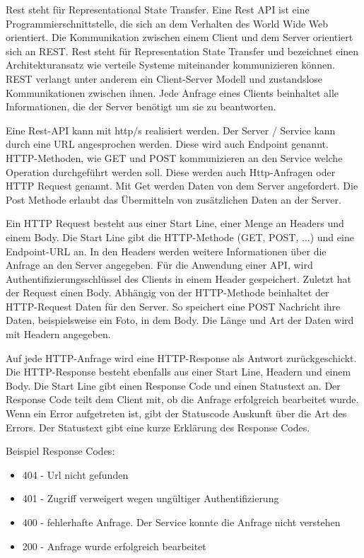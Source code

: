 Rest steht für Representational State Transfer. Eine Rest API ist eine Programmierschnittstelle, die sich an dem Verhalten des World Wide Web orientiert. Die Kommunikation zwischen einem Client und dem Server orientiert sich an REST.
Rest steht für Representation State Transfer und bezeichnet einen Architekturansatz wie verteile Systeme miteinander kommunizieren können. REST verlangt unter anderem ein Client-Server Modell und zustandslose Kommunikationen zwischen ihnen. Jede Anfrage eines Clients beinhaltet alle Informationen, die der Server benötigt um sie zu beantworten. %

Eine Rest-API kann mit http/s realisiert werden. Der Server / Service kann durch eine URL angesprochen werden. Diese wird auch Endpoint genannt. HTTP-Methoden, wie GET und POST kommunizieren an den Service welche Operation durchgeführt werden soll. Diese werden auch Http-Anfragen oder HTTP Request genannt. Mit Get werden Daten von dem Server angefordert. Die Post Methode erlaubt das Übermitteln von zusätzlichen Daten an der Server.

Ein HTTP Request besteht aus einer Start Line, einer Menge an Headers und einem Body. Die Start Line gibt die HTTP-Methode (GET, POST, ...) und eine Endpoint-URL an.
In den Headers werden weitere Informationen über die Anfrage an den Server angegeben. Für die Anwendung einer API, wird Authentifizierungsschlüssel des Clients in einem Header gespeichert.
Zuletzt hat der Request einen Body. Abhängig von der HTTP-Methode beinhaltet der HTTP-Request Daten für den Server. So speichert eine POST Nachricht ihre Daten, beispielsweise ein Foto, in dem Body. Die Länge und Art der Daten wird mit Headern angegeben.
  
Auf jede HTTP-Anfrage wird eine HTTP-Response als Antwort zurückgeschickt. 
Die HTTP-Response besteht ebenfalls aus einer Start Line, Headern und einem Body. Die Start Line gibt einen Response Code und einen Statustext an. Der Response Code teilt dem Client mit, ob die Anfrage erfolgreich bearbeitet wurde. Wenn ein Error aufgetreten ist, gibt der Statuscode Auskunft über die Art des Errors. Der Statustext gibt eine kurze Erklärung des Response Codes.

Beispiel Response Codes:
\begin{itemize}
	\item 404 - Url nicht gefunden
	\item 401 - Zugriff verweigert wegen ungültiger Authentifizierung
	\item 400 - fehlerhafte Anfrage. Der Service konnte die Anfrage nicht verstehen
	\item 200 - Anfrage wurde erfolgreich bearbeitet
\end{itemize}

